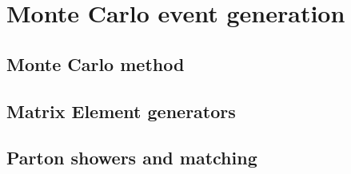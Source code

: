 \chapter{Monte Carlo event generation}
\label{ch:mc}

\section{Monte Carlo method}

\section{Matrix Element generators}

\section{Parton showers and matching}
\label{sec:mc:showering}
